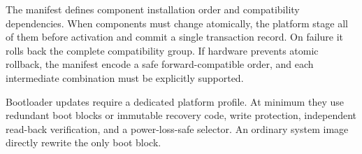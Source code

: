 The manifest defines component installation order and compatibility dependencies.
When components must change atomically, the platform \must stage all of them
before activation and commit a single transaction record. On failure it rolls
back the complete compatibility group. If hardware prevents atomic rollback, the
manifest \must encode a safe forward-compatible order, and each intermediate
combination must be explicitly supported.

Bootloader updates require a dedicated platform profile. At minimum they use
redundant boot blocks or immutable recovery code, write protection, independent
read-back verification, and a power-loss-safe selector. An ordinary system image
\mustnot directly rewrite the only boot block.

